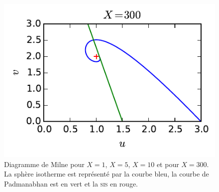 \begin{figure}[h!]
\begin{minipage}[b]{0.40\linewidth}
		\end{minipage}\hfill
		\begin{minipage}[b]{0.48\linewidth}
			\centering \includegraphics{graphe/milne_X300.pdf}
		\end{minipage}
		\caption{Diagramme de Milne pour $X=1$, $X=5$, $X=10$ et pour $X=300$. La sphère isotherme est
		représenté par la courbe bleu, la courbe de Padmanabhan est en vert et la \textsc{sis} en rouge.}
		\label{Milne}
	\end{figure}
